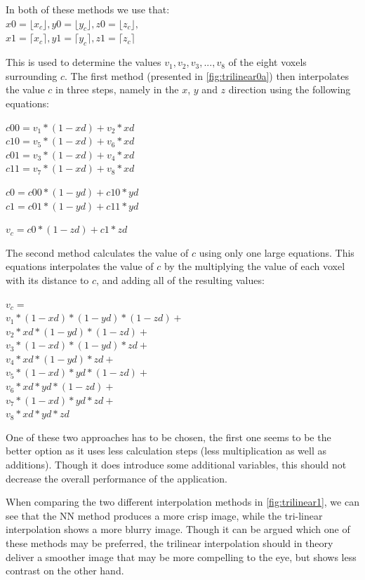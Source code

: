 In both of these methods we use that:\\
$x0 = \lfloor x_c\rfloor, y0 = \lfloor y_c\rfloor, z0 = \lfloor z_c\rfloor,$\\
$x1 = \lceil x_c\rceil, y1 = \lceil y_c\rceil, z1 = \lceil z_c\rceil$

This is used to determine the values $v_1, v_2, v_3, ..., v_8$ of the eight voxels surrounding $c$. The first method \cite{wikiTriLin} (presented in \ref{fig:trilinear0a}) then interpolates the value $c$ in three steps, namely in the $x$, $y$ and $z$ direction using the following equations:

$c00 = v_1*(1-xd) + v_2*xd$\\
$c10 = v_5*(1-xd) + v_6*xd$\\
$c01 = v_3*(1-xd) + v_4*xd$\\
$c11 = v_7*(1-xd) + v_8*xd$

$c0 = c00*(1-yd) + c10*yd$\\
$c1 = c01*(1-yd) + c11*yd$

$v_c = c0*(1-zd) + c1*zd$

The second method \cite{paulBourke} calculates the value of $c$ using only one large equations. This equations interpolates the value of $c$ by the multiplying the value of each voxel with its distance to $c$, and adding all of the resulting values:

$v_c =$\\
$v_1*(1-xd)*(1-yd)*(1-zd) +$\\
$v_2*xd*(1-yd)*(1-zd) +$\\
$v_3*(1-xd)*(1-yd)*zd +$\\
$v_4*xd*(1-yd)*zd +$\\
$v_5*(1-xd)*yd*(1-zd) +$\\
$v_6*xd*yd*(1-zd) +$\\
$v_7*(1-xd)*yd*zd +$\\
$v_8*xd*yd*zd$

One of these two approaches has to be chosen, the first one seems to be the better option as it uses less calculation steps (less multiplication as well as additions). Though it does introduce some additional variables, this should not decrease the overall performance of the application.

When comparing the two different interpolation methods in \ref{fig:trilinear1}, we can see that the NN method produces a more crisp image, while the tri-linear interpolation shows a more blurry image. Though it can be argued which one of these methods may be preferred, the trilinear interpolation should in theory deliver a smoother image that may be more compelling to the eye, but shows less contrast on the other hand.

